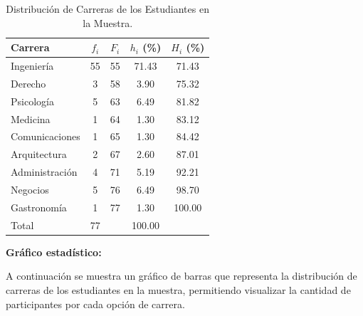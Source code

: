 \documentclass{article}
\begin{document}
\begin{table}[H]
  \centering
  \begin{tabular}{l @{\hskip 0.5cm} c @{\hskip 0.5cm} c @{\hskip 0.5cm} c @{\hskip 0.5cm} c}
    \hline
    \textbf{Carrera} & \textbf{$f_i$} & \textbf{$F_i$} & \textbf{$h_i$ (\%)} & \textbf{$H_i$ (\%)} \\ \hline
    Ingeniería       & 55             & 55             & 71.43               & 71.43               \\ \hline
    Derecho          & 3              & 58             & 3.90                & 75.32               \\ \hline
    Psicología       & 5              & 63             & 6.49                & 81.82               \\ \hline
    Medicina         & 1              & 64             & 1.30                & 83.12               \\ \hline
    Comunicaciones   & 1              & 65             & 1.30                & 84.42               \\ \hline
    Arquitectura     & 2              & 67             & 2.60                & 87.01               \\ \hline
    Administración   & 4              & 71             & 5.19                & 92.21               \\ \hline
    Negocios         & 5              & 76             & 6.49                & 98.70               \\ \hline
    Gastronomía      & 1              & 77             & 1.30                & 100.00              \\ \hline
    Total            & 77             &                & 100.00              &                     \\ \hline
  \end{tabular}
  \caption{Distribución de Carreras de los Estudiantes en la Muestra.}
  \label{tab:carreras-frecuencias}
\end{table}

\textbf{Gráfico estadístico:}

A continuación se muestra un gráfico de barras que representa la distribución de carreras de los estudiantes en la muestra, permitiendo visualizar la cantidad de participantes por cada opción de carrera.
\end{document}
